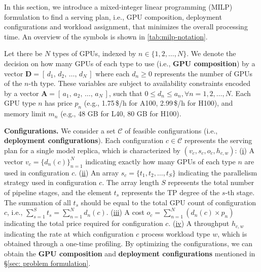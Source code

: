 

In this section, we introduce a mixed-integer linear programming (MILP) formulation to find a serving plan, i.e., GPU composition, deployment configurations and workload assignment, that minimizes the overall processing time. An overview of the symbols is shown in \autoref{tab:milp-notation}.

Let there be $N$ types of GPUs, indexed by $n \in \{1,2,\dots,N\}$. We denote the decision on how many GPUs of each type to use (i.e., \textbf{GPU composition}) by a vector $\mathbf{D} = [\,d_{1},\,d_{2},\,\dots,\,d_{N}\,]$ where each $d_{n} \ge 0$ represents the number of GPUs of the $n$-th type. These variables are subject to availability constraints encoded by a vector $\mathbf{A} = [\,a_{1},\,a_{2},\,\dots,\,a_{N}\,]$,  such that $0 \le d_{n} \le a_{n}, \forall n = 1,2,\dots,N$. Each GPU type $n$ has price $p_n$ (e.g., 1.75\,\$/h for A100, 2.99\,\$/h for H100), and memory limit $m_n$ (e.g., 48 GB for L40, 80 GB for H100).

\textbf{Configurations.} We consider a set $\mathcal{C}$ of feasible configurations (i.e., \textbf{deployment configurations}). Each configuration $c \in \mathcal{C}$ represents the serving plan for a single model replica, which is characterized by $(v_c, s_c, o_c, h_{c,w})$: (\underline{i}) A vector $v_c=\{d_{n}(c)\}_{n=1}^N$ indicating exactly how many GPUs of each type $n$ are used in configuration $c$. (\underline{ii}) An array $s_c=\{t_1, t_2, \dots, t_S\}$ indicating the parallelism strategy used in configuration $c$. The array length $S$ represents the total number of pipeline stages, and the element $t_s$ represents the TP degree of the $s$-th stage. The summation of all $t_s$ should be equal to the total GPU count of configuration $c$, i.e., $\sum_{s=1}^{S} t_s=\sum_{n=1}^{N} d_{n}(c)$.
(\underline{iii}) A cost $o_c = \sum_{n=1}^N (d_{n}(c)\times p_n)$ indicating the total price required for configuration $c$. (\underline{iv}) A throughput $h_{c,w}$ indicating the rate at which configuration $c$ process workload type $w$, which is obtained through a one-time profiling. By optimizing the configurations, we can obtain the \textbf{GPU composition} and \textbf{deployment configurations} mentioned in \S\ref{sec: problem formulation}.

